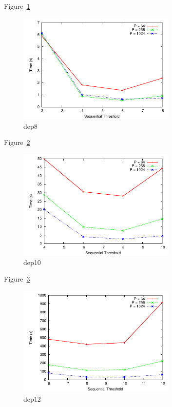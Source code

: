 \documentclass[11pt]{article}
\begin{document}
Figure~\ref{dep8}
\begin{figure}
\centering
\includegraphics[width=0.7\textwidth]{plots/dep8.pdf}
\caption{dep8}
\label{dep8}
\end{figure}
 
Figure~\ref{dep10}
\begin{figure}
\centering
\includegraphics[width=0.7\textwidth]{plots/dep10.pdf}
\caption{dep10}
\label{dep10}
\end{figure}
 
Figure~\ref{dep12}
\begin{figure}
\centering
\includegraphics[width=0.7\textwidth]{plots/dep12.pdf}
\caption{dep12}
\label{dep12}
\end{figure}
 
\end{document}

